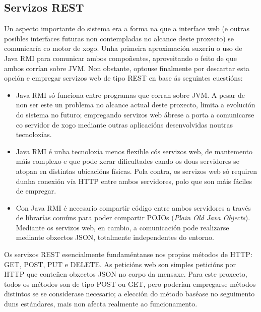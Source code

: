 \subsection{Servizos REST}
Un aspecto importante do sistema era a forma na que a interface web (e outras
posibles interfaces futuras non contempladas no alcance deste proxecto) se
comunicaría co motor de xogo. Unha primeira aproximación suxeriu o uso de
Java RMI para comunicar ambos compoñentes, aproveitando o feito de que ambos
corrían sobre JVM. Non obstante, optouse finalmente por descartar esta
opción e empregar servizos web de tipo REST\cite{rest} en base ás seguintes
cuestións:
\begin{itemize}
  \item Java RMI só funciona entre programas que corran sobre JVM. A pesar de
  non ser este un problema no alcance actual deste proxecto, limita a evolución
  do sistema no futuro; empregando servizos web ábrese a porta a comunicarse co
  servidor de xogo mediante outras aplicacións desenvolvidas noutras
  tecnoloxías.
  \item Java RMI é unha tecnoloxía menos flexible cós servizos web, de
  mantemento máis complexo e que pode xerar dificultades cando os dous
  servidores se atopan en distintas ubicacións físicas. Pola contra, os servizos
  web só requiren dunha conexión vía HTTP entre ambos servidores, polo que son
  máis fáciles de empregar.
  \item Con Java RMI é necesario compartir código entre ambos servidores a
  través de librarías comúns para poder compartir POJOs (\textit{Plain Old
  Java Objects}). Mediante os servizos web, en cambio, a comunicación pode
  realizarse mediante obxectos JSON, totalmente independentes do entorno.
\end{itemize}
Os servizos REST esencialmente fundaméntanse nos propios métodos de HTTP: GET,
POST, PUT e DELETE. As peticións web son simples peticións por HTTP que conteñen
obxectos JSON no corpo da mensaxe. Para este proxecto, todos os métodos son de
tipo POST ou GET, pero poderían empregarse métodos distintos se se considerase
necesario; a elección do método baséase no seguimento duns estándares, mais non
afecta realmente ao funcionamento.

